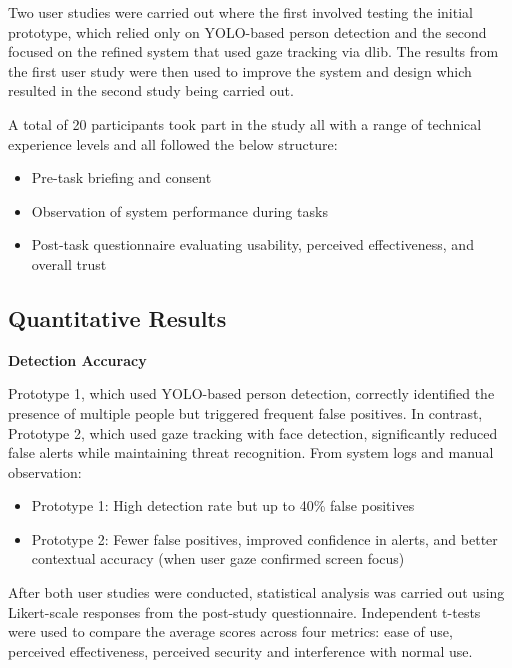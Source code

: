 \documentclass[12pt]{article}
\theoremstyle{plain}
\theoremstyle{definition}
\begin{document}
Two user studies were carried out where the first involved testing the initial prototype, which relied only on YOLO-based person detection and the second focused on the refined system that used gaze tracking via dlib. The results from the first user study were then used to improve the system and design which resulted in the second study being carried out.

A total of 20 participants took part in the study all with a range of technical experience levels and all followed the below structure:

\begin{itemize}
    \item Pre-task briefing and consent
    \item Observation of system performance during tasks
    \item Post-task questionnaire evaluating usability, perceived effectiveness, and overall trust
\end{itemize}

\subsection{Quantitative Results}
\label{quantitative}

\textbf{Detection Accuracy}

Prototype 1, which used YOLO-based person detection, correctly identified the presence of multiple people but triggered frequent false positives. In contrast, Prototype 2, which used gaze tracking with face detection, significantly reduced false alerts while maintaining threat recognition.
From system logs and manual observation:
\begin{itemize}
    \item Prototype 1: High detection rate but up to 40\% false positives
    \item Prototype 2: Fewer false positives, improved confidence in alerts, and better contextual accuracy (when user gaze confirmed screen focus)
\end{itemize}

After both user studies were conducted, statistical analysis was carried out using Likert-scale responses from the post-study questionnaire. Independent t-tests were used to compare the average scores across four metrics: ease of use, perceived effectiveness, perceived security and interference with normal use.
\end{document}
